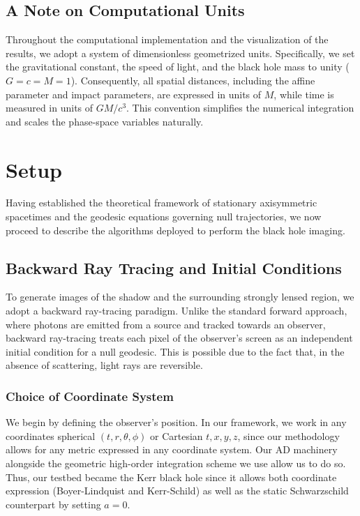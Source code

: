 \documentclass[11pt]{book}
\begin{document}
\section*{A Note on Computational Units}
Throughout the computational implementation and the visualization of the results, we adopt a system of dimensionless geometrized units. Specifically, we set the gravitational constant, the speed of light, and the black hole mass to unity ($G = c = M = 1$). Consequently, all spatial distances, including the affine parameter and impact parameters, are expressed in units of $M$, while time is measured in units of $GM/c^3$. This convention simplifies the numerical integration and scales the phase-space variables naturally.

\chapter{Setup}

Having established the theoretical framework of stationary axisymmetric spacetimes and the geodesic equations governing null trajectories, we now proceed to describe the algorithms deployed to perform the black hole imaging.

\section{Backward Ray Tracing and Initial Conditions}

To generate images of the shadow and the surrounding strongly lensed region, we adopt a backward ray-tracing paradigm. Unlike the standard forward approach, where photons are emitted from a source and tracked towards an observer, backward ray-tracing treats each pixel of the observer's screen as an independent initial condition for a null geodesic. This is possible due to the fact that, in the absence of scattering, light rays are reversible. 

\subsection{Choice of Coordinate System}
We begin by defining the observer's position. In our framework, we work in any coordinates spherical \((t, r, \theta, \phi)\) or Cartesian \(t,x,y,z\), since our methodology allows for any metric expressed in any coordinate system. Our AD machinery alongside the geometric high-order integration scheme we use allow us to do so. Thus, our testbed became the Kerr black hole since it allows both coordinate expression (Boyer-Lindquist and Kerr-Schild) as well as the static Schwarzschild counterpart by setting $a=0$.
\end{document}
